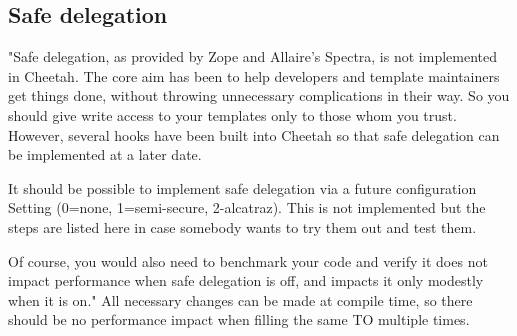 \subsection{Safe delegation}

"Safe delegation, as provided by Zope and Allaire's Spectra, is not implemented
in Cheetah.  The core aim has been to help developers and template maintainers
get things done, without throwing unnecessary complications in their
way.  So you should give write access to your templates only to those whom you
trust.  However, several hooks have been built into Cheetah so that safe
delegation can be implemented at a later date.  

It should be possible to implement safe delegation via a future configuration
Setting  (0=none, 1=semi-secure, 2-alcatraz).  This
is not implemented but the steps are listed here in case somebody wants to try
them out and test them.  

Of course, you would also need to benchmark your code
and verify it does not impact performance when safe delegation is off, and 
impacts it only modestly when it is on."  All necessary changes can be made
at compile time, so there should be no performance impact when filling the
same TO multiple times.


